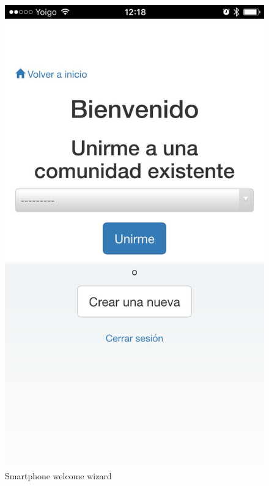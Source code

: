\documentclass{DeustoFDP}
\begin{document}
\begin{figure}[h!]
\centering
\includegraphics[width=0.7\linewidth]{fig/Manual/mobilewelcome}
\caption[Smartphone welcome wizard]{Smartphone welcome wizard}
\label{fig:mobilewelcome}
\end{figure}
\end{document}
